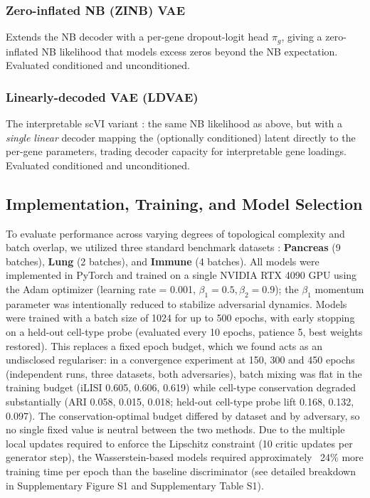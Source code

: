 \documentclass[unnumsec,webpdf,contemporary,large]{oup-authoring-template}%
\theoremstyle{thmstyleone}%
\theoremstyle{thmstyletwo}%
\theoremstyle{thmstylethree}%
\begin{document}
\subsubsection{Zero-inflated NB (ZINB) VAE}
Extends the NB decoder with a per-gene dropout-logit head $\pi_g$, giving a zero-inflated NB likelihood \citep{Risso2018-zinbwave} that models excess zeros beyond the NB expectation. Evaluated conditioned and unconditioned.

\subsubsection{Linearly-decoded VAE (LDVAE)}
The interpretable scVI variant \citep{Svensson2020-ldvae}: the same NB likelihood as above, but with a \emph{single linear} decoder mapping the (optionally conditioned) latent directly to the per-gene parameters, trading decoder capacity for interpretable gene loadings. Evaluated conditioned and unconditioned.

\subsection{Implementation, Training, and Model Selection}
To evaluate performance across varying degrees of topological complexity and batch overlap, we utilized three standard benchmark datasets \citep{Luecken2022-fb}: \textbf{Pancreas} (9 batches), \textbf{Lung} (2 batches), and \textbf{Immune} (4 batches). All models were implemented in PyTorch and trained on a single NVIDIA RTX 4090 GPU using the Adam optimizer (learning rate = 0.001, $\beta_1=0.5, \beta_2=0.9$); the $\beta_1$ momentum parameter was intentionally reduced to stabilize adversarial dynamics. Models were trained with a batch size of 1024 for up to 500 epochs, with early stopping on a held-out cell-type probe (evaluated every 10 epochs, patience 5, best weights restored). This replaces a fixed epoch budget, which we found acts as an undisclosed regulariser: in a convergence experiment at 150, 300 and 450 epochs (independent runs, three datasets, both adversaries), batch mixing was flat in the training budget (iLISI 0.605, 0.606, 0.619) while cell-type conservation degraded substantially (ARI 0.058, 0.015, 0.018; held-out cell-type probe lift 0.168, 0.132, 0.097). The conservation-optimal budget differed by dataset and by adversary, so no single fixed value is neutral between the two methods. Due to the multiple local updates required to enforce the Lipschitz constraint (10 critic updates per generator step), the Wasserstein-based models required approximately ~24\% more training time per epoch than the baseline discriminator (see detailed breakdown in Supplementary Figure S1 and Supplementary Table S1).
\end{document}
